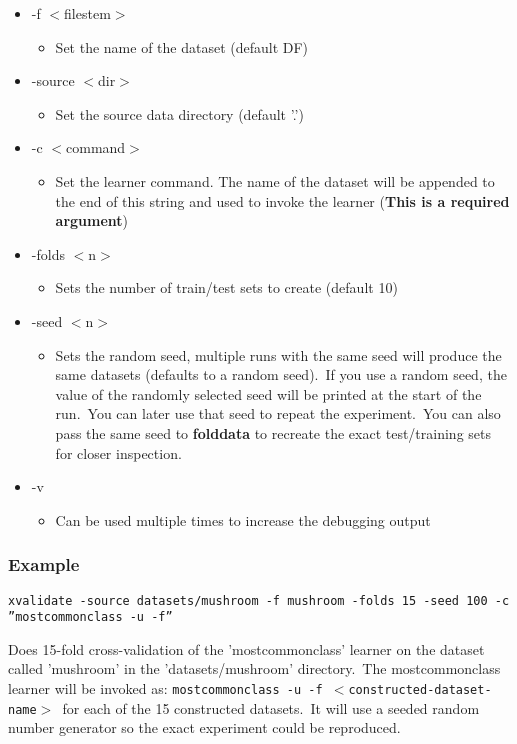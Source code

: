\begin{itemize}
\item -f $<$filestem$>$\begin{itemize}
\item Set the name of the dataset (default DF)\end{itemize}
\item -source $<$dir$>$\begin{itemize}
\item Set the source data directory (default '.')\end{itemize}
\item -c $<$command$>$\begin{itemize}
\item Set the learner command. The name of the dataset will be appended to the end of this string and used to invoke the learner ({\bf This is a required argument})\end{itemize}
\item -folds $<$n$>$\begin{itemize}
\item Sets the number of train/test sets to create (default 10)\end{itemize}
\item -seed $<$n$>$\begin{itemize}
\item Sets the random seed, multiple runs with the same seed will produce the same datasets (defaults to a random seed).\  If you use a random seed, the value of the randomly selected seed will be printed at the start of the run.\  You can later use that seed to repeat the experiment.\  You can also pass the same seed to {\bf folddata} to recreate the exact test/training sets for closer inspection.\end{itemize}
\item -v\begin{itemize}
\item Can be used multiple times to increase the debugging output\end{itemize}
\end{itemize}


\subsubsection*{Example}

{\tt }

{\tt }

{\tt xvalidate -source datasets/mushroom -f mushroom -folds 15 -seed 100 -c ''mostcommonclass -u -f''} 

Does 15-fold cross-validation of the 'mostcommonclass' learner on the dataset called 'mushroom' in the 'datasets/mushroom' directory.\  The mostcommonclass learner will be invoked as: {\tt mostcommonclass -u -f $<$constructed-dataset-name$>$ }for each of the 15 constructed datasets.\  It will use a seeded random number generator so the exact experiment could be reproduced. 

